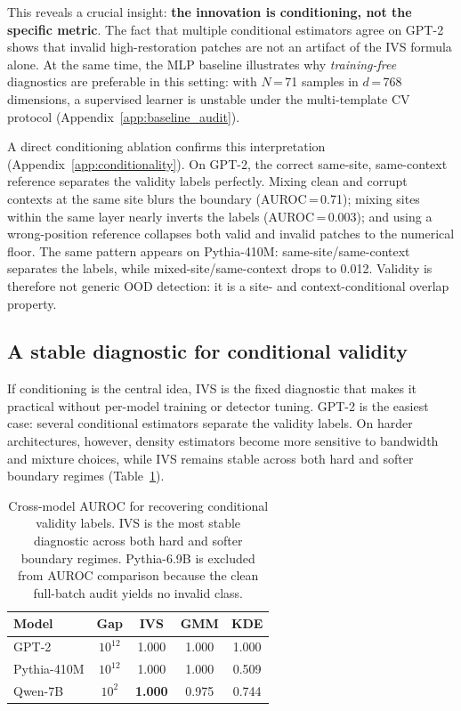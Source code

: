\documentclass{article}
\begin{document}
This reveals a crucial insight: \textbf{the innovation is conditioning, not the specific metric}. The fact that multiple conditional estimators agree on GPT-2 shows that invalid high-restoration patches are not an artifact of the IVS formula alone. At the same time, the MLP baseline illustrates why \emph{training-free} diagnostics are preferable in this setting: with $N$\,=\,71 samples in $d$\,=\,768 dimensions, a supervised learner is unstable under the multi-template CV protocol (Appendix~\ref{app:baseline_audit}).

A direct conditioning ablation confirms this interpretation (Appendix~\ref{app:conditionality}). On GPT-2, the correct same-site, same-context reference separates the validity labels perfectly. Mixing clean and corrupt contexts at the same site blurs the boundary (AUROC\,=\,0.71); mixing sites within the same layer nearly inverts the labels (AUROC\,=\,0.003); and using a wrong-position reference collapses both valid and invalid patches to the numerical floor. The same pattern appears on Pythia-410M: same-site/same-context separates the labels, while mixed-site/same-context drops to 0.012. Validity is therefore not generic OOD detection: it is a site- and context-conditional overlap property.

\subsection{A stable diagnostic for conditional validity}

If conditioning is the central idea, IVS is the fixed diagnostic that makes it practical without per-model training or detector tuning. GPT-2 is the easiest case: several conditional estimators separate the validity labels. On harder architectures, however, density estimators become more sensitive to bandwidth and mixture choices, while IVS remains stable across both hard and softer boundary regimes (Table~\ref{tab:cross_auroc}).

\begin{table}[t]
\caption{Cross-model AUROC for recovering conditional validity labels. IVS is the most stable diagnostic across both hard and softer boundary regimes. Pythia-6.9B is excluded from AUROC comparison because the clean full-batch audit yields no invalid class.}
\label{tab:cross_auroc}
\vspace{-2mm}
\begin{center}\small
\begin{tabular}{lcccc}
\toprule
\textbf{Model} & \textbf{Gap} & \textbf{IVS} & \textbf{GMM} & \textbf{KDE} \\
\midrule
GPT-2 & $10^{12}$ & 1.000 & 1.000 & 1.000 \\
Pythia-410M & $10^{12}$ & 1.000 & 1.000 & 0.509 \\
Qwen-7B & $10^{2}$ & \textbf{1.000} & 0.975 & 0.744 \\
\bottomrule
\end{tabular}
\end{center}
\vspace{-3mm}
\end{table}
\end{document}
